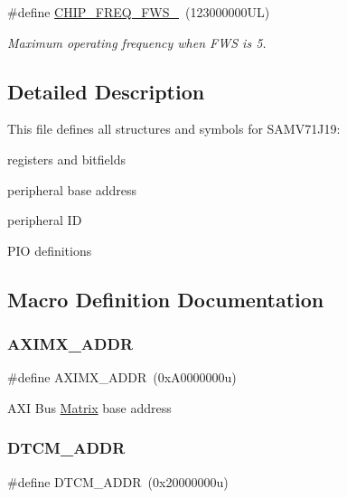 \begin{DoxyCompactItemize}
\mbox{\label{group__SAMV71J19__definitions_ga3b66824f858591135877b369f98d48a5}} 
\#define \mbox{\hyperlink{group__SAMV71J19__definitions_ga3b66824f858591135877b369f98d48a5}{C\+H\+I\+P\+\_\+\+F\+R\+E\+Q\+\_\+\+F\+W\+S\+\_}}~(123000000\+U\+L)
\begin{DoxyCompactList}\small\item\em Maximum operating frequency when F\+WS is 5. \end{DoxyCompactList}\end{DoxyCompactItemize}


\subsection{Detailed Description}
This file defines all structures and symbols for S\+A\+M\+V71\+J19\+:
\begin{DoxyItemize}
\item registers and bitfields
\item peripheral base address
\item peripheral ID
\item P\+IO definitions 
\end{DoxyItemize}

\subsection{Macro Definition Documentation}
\mbox{\label{group__SAMV71J19__definitions_ga2fb7cc681bf5e7fbce5e3635b72a330a}} 
\subsubsection{\texorpdfstring{AXIMX\_ADDR}{AXIMX\_ADDR}}
{\footnotesize\ttfamily \#define A\+X\+I\+M\+X\+\_\+\+A\+D\+DR~(0x\+A0000000u)}

A\+XI Bus \mbox{\hyperlink{structMatrix}{Matrix}} base address \mbox{\label{group__SAMV71J19__definitions_ga26626a425f7ebb3a0c2dbc276f0d9f78}} 
\subsubsection{\texorpdfstring{DTCM\_ADDR}{DTCM\_ADDR}}
{\footnotesize\ttfamily \#define D\+T\+C\+M\+\_\+\+A\+D\+DR~(0x20000000u)}

